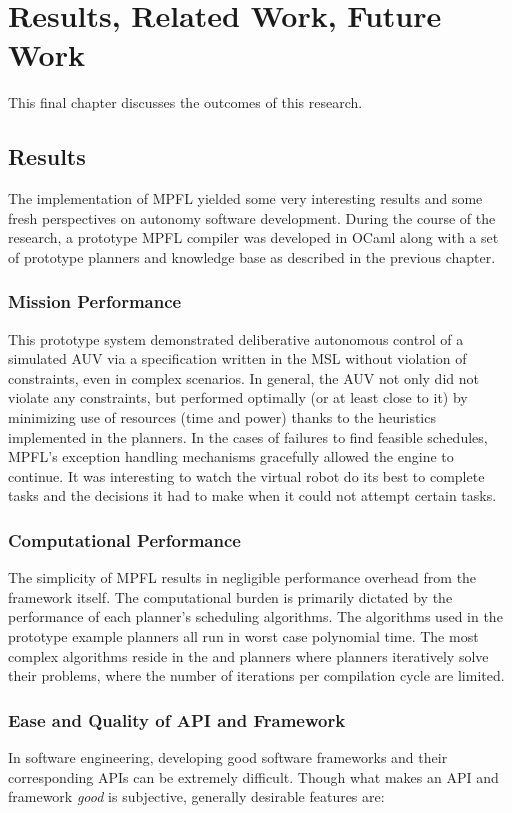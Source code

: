 
\chapter{Results, Related Work, Future Work}
This final chapter discusses the outcomes of this research.

\section{Results}
The implementation of MPFL yielded some very interesting results and some fresh perspectives on autonomy software development. During the course of the research, a prototype MPFL compiler was developed in OCaml along with a set of prototype planners and knowledge base as described in the previous chapter.

\subsection{Mission Performance}
This prototype system demonstrated deliberative autonomous control of a simulated AUV via a specification written in the MSL without violation of constraints, even in complex scenarios. In general, the AUV not only did not violate any constraints, but performed optimally (or at least close to it) by minimizing use of resources (time and power) thanks to the heuristics implemented in the planners. In the cases of failures to find feasible schedules, MPFL's exception handling mechanisms gracefully allowed the engine to continue. It was interesting to watch the virtual robot do its best to complete tasks  and the decisions it had to make when it could not attempt certain tasks.

\subsection{Computational Performance}
The simplicity of MPFL results in negligible performance overhead from the framework itself. The computational burden is primarily dictated by the performance of each planner's scheduling algorithms. The algorithms used in the prototype example planners all run in worst case polynomial time. The most complex algorithms reside in the  and  planners where planners iteratively solve their problems, where the number of iterations per compilation cycle are limited. 

\subsection{Ease and Quality of API and Framework}
In software engineering, developing good software frameworks and their corresponding APIs can be extremely difficult. Though what makes an API and framework \textit{good} is subjective, generally desirable features are:

